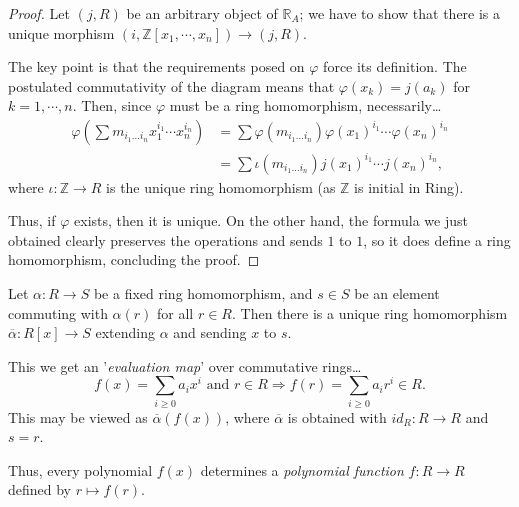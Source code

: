 \begin{proof}
Let $(j,R)$ be an arbitrary object of $\mathbb{R}_A$; we have to show that there is a unique morphism $(i, \mathbb{Z}[x_1, \cdots, x_n]) \rightarrow (j, R)$.

The key point is that the requirements posed on $\varphi$ force its definition. The postulated commutativity of the diagram means that $\varphi(x_k) = j(a_k)$
for $k = 1, \cdots, n$. Then, since $\varphi$ must be a ring homomorphism, necessarily\dots
\begin{align*}
\varphi(\sum m_{i_1\dots i_n}x_1^{i_1}\cdots x_n^{i_n}) &= \sum \varphi(m_{i_1\dots i_n})\varphi(x_1)^{i_1}\cdots \varphi(x_n)^{i_n} \\
														&= \sum \iota(m_{i_1\dots i_n})j(x_1)^{i_1}\cdots j(x_n)^{i_n},
\end{align*}
where $\iota: \mathbb{Z} \rightarrow R$ is the unique ring homomorphism (as $\mathbb{Z}$ is initial in Ring).

Thus, if $\varphi$ exists, then it is unique. On the other hand, the formula we just obtained clearly preserves the operations and sends $1$ to $1$,
so it does define a ring homomorphism, concluding the proof.
\end{proof}

\label{polynomialevaluationmap}
Let $\alpha: R \rightarrow S$ be a fixed ring homomorphism, and $s \in S$ be an element commuting with $\alpha(r)$ for all $r \in R$.
Then there is a unique ring homomorphism $\overline{\alpha}: R[x] \rightarrow S$ extending $\alpha$ and sending $x$ to $s$.\newline

\noindent This we get an '\emph{evaluation map}' over commutative rings\dots
$$f(x) = \sum_{i \geq 0} a_i x^i \textrm{ and } r \in R \Rightarrow f(r) = \sum_{i \geq 0} a_i r^i \in R.$$
This may be viewed as $\overline{\alpha}(f(x))$, where $\overline{\alpha}$ is obtained with $id_R : R \rightarrow R$ and $s = r$.\newline

\noindent Thus, every polynomial $f(x)$ determines a \emph{polynomial function}\label{polynomialfunction} $f : R \rightarrow R$ defined by $r \mapsto f(r)$.